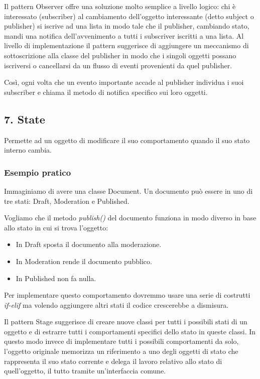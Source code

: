 \documentclass{report}
\begin{document}
\medskip
\noindent
Il pattern Observer offre una soluzione molto semplice a livello logico: chi è interessato (subscriber) al cambiamento dell'oggetto interessante (detto subject o publisher) si iscrive ad una lista in modo tale che il publisher, cambiando stato, mandi una notifica dell'avvenimento a tutti i subscriver iscritti a una lista. Al livello di implementazione il pattern suggerisce di aggiungere un meccanismo di sottoscrizione alla classe del publisher in modo che i singoli oggetti possano iscriversi o cancellarsi da un flusso di eventi provenienti da quel publisher.

\noindent
Così, ogni volta che un evento importante accade al publisher individua i suoi subscriber e chiama il metodo di notifica specifico sui loro oggetti.

\subsection*{7. State}
Permette ad un oggetto di modificare il suo comportamento quando il suo stato interno cambia.

\subsubsection*{Esempio pratico}
Immaginiamo di avere una classe Document. Un documento può essere in uno di tre stati: Draft, Moderation e Published.

\noindent
Vogliamo che il metodo \textit{publish()} del documento funziona in modo diverso in base allo stato in cui si trova l'oggetto: 
\begin{itemize}
    \item In Draft sposta il documento alla moderazione.
    \item In Moderation rende il documento pubblico.
    \item In Published non fa nulla.
\end{itemize}

\noindent
Per implementare questo comportamento dovremmo usare una serie di costrutti \textit{if-elif} ma volendo aggiungere altri stati il codice crescerebbe a dismisura.

\medskip
\noindent
Il pattern Stage suggerisce di creare nuove classi per tutti i possibili stati di un oggetto e di estrarre tutti i comportamenti specifici dello stato in queste classi. In questo modo invece di implementare tutti i possibili comportamenti da solo, l'oggetto originale memorizza un riferimento a uno degli oggetti di stato che rappresenta il suo stato corrente e delega il lavoro relativo allo stato di quell'oggetto, il tutto tramite un'interfaccia comune.
\end{document}
